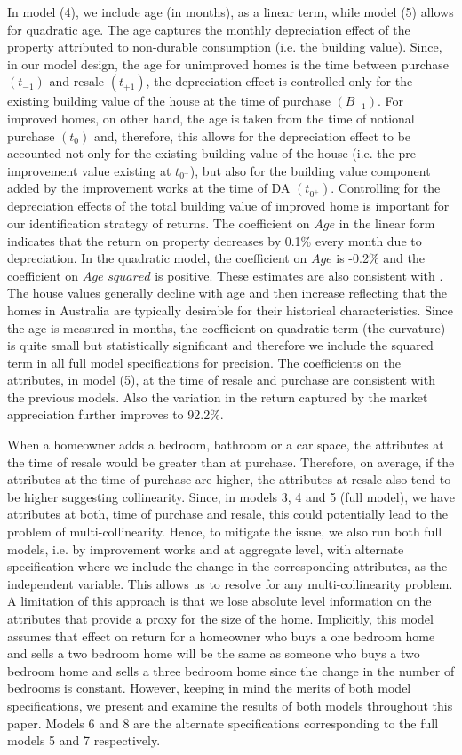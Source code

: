 \documentclass[AEJ,reqno, draftmode]{AEA} %
\begin{document}
In model (4), we include age (in months), as a linear term, while model (5) allows for quadratic age. The age captures the monthly depreciation effect of the property attributed to non-durable consumption (i.e. the building value). Since, in our model design, the age for unimproved homes is the time between purchase $(t_{-1})$ and resale $(t_{+1})$, the depreciation effect is controlled only for the existing building value of the house at the time of purchase $(B_{-1})$. For improved homes, on other hand, the age is taken from the time of notional purchase $(t_0)$ and, therefore, this allows for the depreciation effect to be accounted not only for the existing building value of the house (i.e. the pre-improvement value existing at $t_{0^-}$), but also for the building value component added by the improvement works at the time of DA $(t_{0^+})$. Controlling for the depreciation effects of the total building value of improved home is important for our identification strategy of returns. The coefficient on $Age$ in the linear form indicates that the return on property decreases by 0.1\% every month due to depreciation. In the quadratic model, the coefficient on $Age$ is -0.2\% and the coefficient on $Age\_squared$ is positive. These estimates are also consistent with \citep{kiel1995effect}. The house values generally decline with age and then increase reflecting that the homes in Australia are typically desirable for their historical characteristics. Since the age is measured in months, the coefficient on quadratic term (the curvature) is quite small but statistically significant and therefore we include the squared term in all full model specifications for precision. The coefficients on the attributes, in model (5), at the time of resale and purchase are consistent with the previous models. Also the variation in the return captured by the market appreciation further improves to 92.2\%.

When a homeowner adds a bedroom, bathroom or a car space, the attributes at the time of resale would be greater than at purchase. Therefore, on average, if the attributes at the time of purchase are higher, the attributes at resale also tend to be higher suggesting collinearity. Since, in models 3, 4 and 5 (full model), we have attributes at both, time of purchase and resale, this could potentially lead to the problem of multi-collinearity. Hence, to mitigate the issue, we also run both full models, i.e. by improvement works and at aggregate level, with alternate specification where we include the change in the corresponding attributes, as the independent variable. This allows us to resolve for any multi-collinearity problem. A limitation of this approach is that we lose absolute level information on the attributes that provide a proxy for the size of the home. Implicitly, this model assumes that effect on return for a homeowner who buys a one bedroom home and sells a two bedroom home will be the same as someone who buys a two bedroom home and sells a three bedroom home since the change in the number of bedrooms is constant. However, keeping in mind the merits of both model specifications, we present and examine the results of both models throughout this paper. Models 6 and 8 are the alternate specifications corresponding to the full models 5 and 7 respectively.
\end{document}
